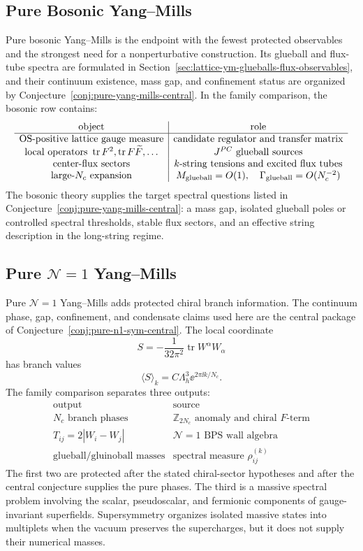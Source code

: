 \subsection{Pure Bosonic Yang--Mills}

Pure bosonic Yang--Mills is the endpoint with the fewest protected
observables and the strongest need for a nonperturbative construction.  Its
glueball and flux-tube spectra are formulated in
Section~\ref{sec:lattice-ym-glueballs-flux-observables}, and their continuum
existence, mass gap, and confinement status are organized by
Conjecture~\ref{conj:pure-yang-mills-central}.  In the family comparison, the
bosonic row contains:
\[
\begin{array}{c|c}
\text{object} & \text{role}\\
\hline
\text{OS-positive lattice gauge measure} &
  \text{candidate regulator and transfer matrix}\\
\text{local operators }\operatorname{tr}F^2,\operatorname{tr}F\widetilde F,\ldots &
  J^{PC}\text{ glueball sources}\\
\text{center-flux sectors} &
  k\text{-string tensions and excited flux tubes}\\
\text{large-}N_c\text{ expansion} &
  M_{\rm glueball}=O(1),\quad \Gamma_{\rm glueball}=O(N_c^{-2})
\end{array}
\]
The bosonic theory supplies the target spectral questions listed in
Conjecture~\ref{conj:pure-yang-mills-central}: a mass gap, isolated glueball
poles or controlled spectral thresholds, stable flux sectors, and an effective
string description in the long-string regime.

\subsection[Pure N=1 Yang--Mills]{Pure \(\mathcal N=1\) Yang--Mills}

Pure \(\mathcal N=1\) Yang--Mills adds protected chiral branch information.
The continuum phase, gap, confinement, and condensate claims used here are the
central package of Conjecture~\ref{conj:pure-n1-sym-central}.  The local
coordinate
\[
  S=-\frac{1}{32\pi^2}\operatorname{tr}W^\alpha W_\alpha
\]
has branch values
\[
  \langle S\rangle_k=C\Lambda_h^3\ee^{2\pi\ii k/N_c}.
\]
The family comparison separates three outputs:
\[
\begin{array}{c|c}
\text{output} & \text{source}\\
\hline
N_c\text{ branch phases} & \mathbb Z_{2N_c}\text{ anomaly and chiral }F\text{-term}\\
T_{ij}=2|W_i-W_j| & \mathcal N=1\text{ BPS wall algebra}\\
\text{glueball/gluinoball masses} & \text{spectral measure }\rho_{ij}^{(k)}
\end{array}
\]
The first two are protected after the stated chiral-sector hypotheses and after
the central conjecture supplies the pure phases.  The third is a massive
spectral problem involving the scalar, pseudoscalar, and fermionic components
of gauge-invariant superfields.  Supersymmetry organizes isolated massive
states into multiplets when the vacuum preserves the supercharges, but it does
not supply their numerical masses.

